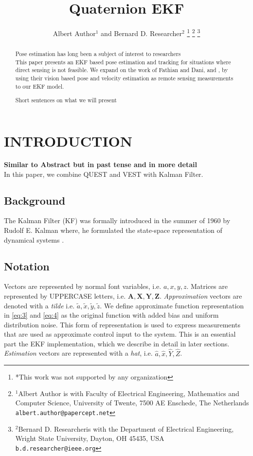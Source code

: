 \documentclass[letterpaper, 10 pt, conference]{ieeeconf}  %
\title{\LARGE \bf Quaternion EKF }
\author{Albert Author$^{1}$ and Bernard D. Researcher$^{2}$%
\thanks{*This work was not supported by any organization}%
\thanks{$^{1}$Albert Author is with Faculty of Electrical Engineering, Mathematics and Computer Science,
        University of Twente, 7500 AE Enschede, The Netherlands
        {\tt\small albert.author@papercept.net}}%
\thanks{$^{2}$Bernard D. Researcheris with the Department of Electrical Engineering, Wright State University,
        Dayton, OH 45435, USA
        {\tt\small b.d.researcher@ieee.org}}%
}
\begin{document}
\maketitle
\thispagestyle{empty}
\pagestyle{empty}


\begin{abstract}

Pose estimation has long been a subject of interest to researchers\\

This paper presents an EKF based pose estimation and tracking for situations where direct sensing is not feasible. We expand on the work of Fathian and Dani, \cite{quest} and \cite{vest}, by using their vision based pose and velocity estimation as remote sensing measurements to our EKF model.


Short sentences on what we will present

\end{abstract}


\section{INTRODUCTION}

\textbf{Similar to Abstract but in past tense and in more detail}\\

In this paper, we combine QUEST and VEST with Kalman Filter.\\

\subsection{Background}

The Kalman Filter (KF) was formally introduced in the summer of 1960 by Rudolf E. Kalman where, he formulated the state-space representation of dynamical systems \cite{KF}.




\subsection{Notation}
Vectors are represented by normal font variables, i.e. $a,x,y,z$.
Matrices are represented by UPPERCASE letters, i.e. $\mathbf{A,X,Y,Z}$.
\textit{Approximation} vectors are denoted with a \textit{tilde} i.e. $\widetilde{a},\widetilde{x},\widetilde{y},\widetilde{z}$.
We define approximate function representation
in \ref{eq:3} and \ref{eq:4} as the original function with added bias and uniform distribution noise.
This form of representation is used to express measurements that
are used as approximate control input to the system. This is an essential part the EKF
implementation, which we describe in detail in later sections.
\textit{Estimation} vectors are represented with a \textit{hat}, i.e. \(\widehat{a},\widehat{x},\widehat{Y},\widehat{Z}\).
\end{document}
